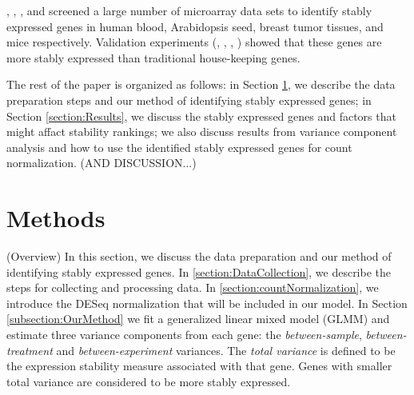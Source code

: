 \documentclass[11pt, a4paper]{article}
\begin{document}
\cite{stamova2009identification},  \citet{dekkers2012identification}, \citet{gur2009identification}, and
 \citet{frericks2008toolbox} screened a large number of microarray data sets
 to identify stably expressed genes in human blood, Arabidopsis seed, breast tumor tissues,
 and mice respectively.
Validation experiments (\cite{czechowski2005genome},
\cite{dekkers2012identification}, \cite{huggett2005real},
\cite{stamova2009identification}) showed that these genes are more stably
expressed than traditional house-keeping genes.  




The rest of the paper is organized as follows: in Section \ref{section:Methods}, we describe the data preparation steps and our method of identifying stably expressed genes; in Section \ref{section:Results}, we discuss the stably expressed genes and factors that might affact stability rankings; we also discuss results from variance component analysis and how to use the identified stably expressed genes for count normalization. (AND DISCUSSION...)


\section{Methods} \label{section:Methods}
(Overview) In this section, we discuss the data preparation and our method of identifying stably expressed genes. In \ref{section:DataCollection}, we describe the steps for collecting and processing data. In \ref{section:countNormalization}, we introduce the DESeq normalization that will be included in our model. In Section \ref{subsection:OurMethod}  we fit a generalized linear mixed model (GLMM) \citep{mccullagh1989generalized} and estimate three variance components from each gene: the \textit{between-sample}, \textit{between-treatment} and \textit{between-experiment} variances.
 The \textit{total variance} is defined to be the expression stability measure associated with that gene. Genes with smaller total variance are considered to be more stably expressed. 
\end{document}
